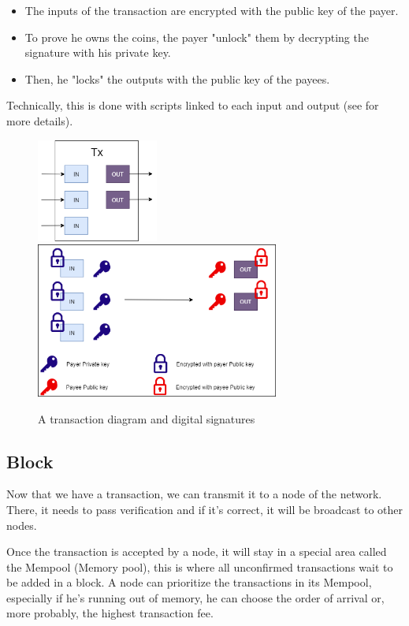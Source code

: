 \begin{itemize}
  \item The inputs of the transaction are encrypted with the public key of the payer.
  \item To prove he owns the coins, the payer "unlock" them by decrypting the signature with his private key.
  \item Then, he "locks" the outputs with the public key of the payees.
\end{itemize}

Technically, this is done with scripts linked to each input and output (see \cite{broken_crypto_primitives} for more details).


\begin{figure}[h]
\centering
\includegraphics[width=4cm]{Figures/Transaction}
\hspace{1cm}
\includegraphics[width=8cm]{Figures/Transaction2}
\caption{A transaction diagram and digital signatures}
\label{transaction}
\end{figure}

  \subsection{Block}

Now that we have a transaction, we can transmit it to a node of the network. There, it needs to pass verification and if it's correct, it will be broadcast to other nodes. \newline

Once the transaction is accepted by a node, it will stay in a special area called the Mempool (Memory pool), this is where all unconfirmed transactions wait to be added in a block. A node can prioritize the transactions in its Mempool, especially if he's running out of memory, he can choose the order of arrival or, more probably, the highest transaction fee.

